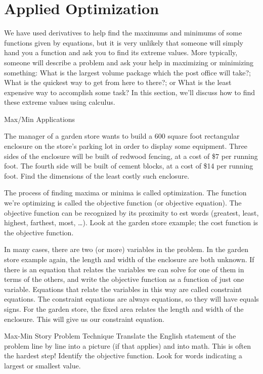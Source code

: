 \section{Applied Optimization}
\label{sec:app-opt}

We have used derivatives to help find the maximums and minimums of some functions given by equations, but it is very unlikely that someone will simply hand you a function and ask you to find its extreme values. More typically, someone will describe a problem and ask your help in maximizing or minimizing something: What is the largest volume package which the post office will take?; What is the quickest way to get from here to there?; or What is the least expensive way to accomplish some task? In this section, we’ll discuss how to find these extreme values using calculus.

Max/Min Applications
\begin{example}
The manager of a garden store wants to build a 600 square foot rectangular enclosure on the store’s parking lot in order to display some equipment. Three sides of the enclosure will be built of redwood fencing, at a cost of \$7 per running foot. The fourth side will be built of cement blocks, at a cost of \$14 per running foot. Find the dimensions of the least costly such enclosure.
\end{example}

The process of finding maxima or minima is called optimization. The function we're optimizing is called the objective function (or objective equation). The objective function can be recognized by its proximity to est words (greatest, least, highest, farthest, most, …). Look at the garden store example; the cost function is the objective function.

In many cases, there are two (or more) variables in the problem. In the garden store example again, the length and width of the enclosure are both unknown. If there is an equation that relates the variables we can solve for one of them in terms of the others, and write the objective function as a function of just one variable. Equations that relate the variables in this way are called constraint equations. The constraint equations are always equations, so they will have equals signs. For the garden store, the fixed area relates the length and width of the enclosure. This will give us our constraint equation.

Max-Min Story Problem Technique
Translate the English statement of the problem line by line into a picture (if that applies) and into math. This is often the hardest step!
Identify the objective function. Look for words indicating a largest or smallest value.

